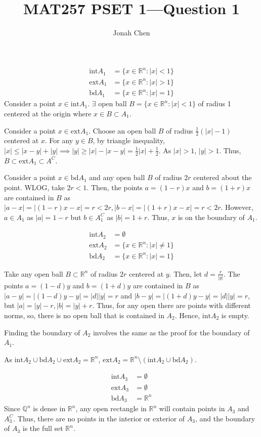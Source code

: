 \documentclass[a4paper]{article}
\title{MAT257 PSET 1---Question 1}
\author{Jonah Chen}
\numberwithin{equation}{section}
\newcommand{\R}{\mathbb{R}}
\begin{document}
    \sffamily
    \begin{align*}
        \mathrm{int}A_1&=\{x\in\R^n:|x|<1\}\\
        \mathrm{ext}A_1&=\{x\in\R^n:|x|>1\}\\
        \mathrm{bd}A_1&=\{x\in\R^n:|x|=1\}
    \end{align*}
    Consider a point $x\in\mathrm{int}A_1$. $\exists$ open ball $B=\{x\in\R^n:|x|<1\}$ of radius 1 centered at the origin where $x\in B\subset A_1$. 
    
    Consider a point $x\in\mathrm{ext}A_1$. Choose an open ball $B$ of radius $\frac{1}{2}(|x|-1)$ centered at $x$. For any $y\in B$, by triangle inequality, $|x|\leq|x-y|+|y|\implies |y|\geq|x|-|x-y|=\frac{1}{2}|x|+\frac{1}{2}$. As $|x|>1$, $|y|>1$. Thus, $B\subset\mathrm{ext}A_1\subset A^C$. 

    Consider a point $x\in\mathrm{bd}A_1$ and any open ball $B$ of radius $2r$ centered about the point. WLOG, take $2r<1$. Then, the points $a=(1-r)x$ and $b=(1+r)x$ are contained in $B$ as $|a-x|=|(1-r)x-x|=r<2r, |b-x|=|(1+r)x-x|=r<2r$. However, $a\in A_1$ as $|a|=1-r$ but $b\in A_1^C$ as $|b|=1+r$. Thus, $x$ is on the boundary of $A_1$.

    \begin{align*}
        \mathrm{int}A_2&=\emptyset\\
        \mathrm{ext}A_2&=\{x\in\R^n:|x|\neq 1\}\\
        \mathrm{bd}A_2 &=\{x\in\R^n:|x|=1\}
    \end{align*}

    Take any open ball $B\subset\R^n$ of radius $2r$ centered at $y$. Then, let $d=\frac{r}{|y|}$. The points $a=(1-d)y$ and $b=(1+d)y$ are contained in $B$ as $|a-y|=|(1-d)y-y|=|d||y|=r$ and $|b-y|=|(1+d)y-y|=|d||y|=r$, but $|a|=|y|-r, |b|=|y|+r$. Thus, for any open there are points with different norms, so, there is no open ball that is contained in $A_2$. Hence, $\mathrm{int}A_2$ is empty.

    Finding the boundary of $A_2$ involves the same as the proof for the boundary of $A_1$.
    
    As $\mathrm{int}A_2\cup\mathrm{bd}A_2\cup\mathrm{ext}A_2=\R^n$, $\mathrm{ext}A_2=\R^n\setminus(\mathrm{int}A_2\cup\mathrm{bd}A_2)$.

    \begin{align*}
        \mathrm{int}A_3&=\emptyset\\
        \mathrm{ext}A_3&=\emptyset\\
        \mathrm{bd}A_3 &=\R^n
    \end{align*}
    Since $\mathbb Q^n$ is dense in $\R^n$, any open rectangle in $\R^n$ will contain points in $A_3$ and $A_3^C$. Thus, there are no points in the interior or exterior of $A_3$, and the boundary of $A_3$ is the full set $\R^n$.  
\end{document}
